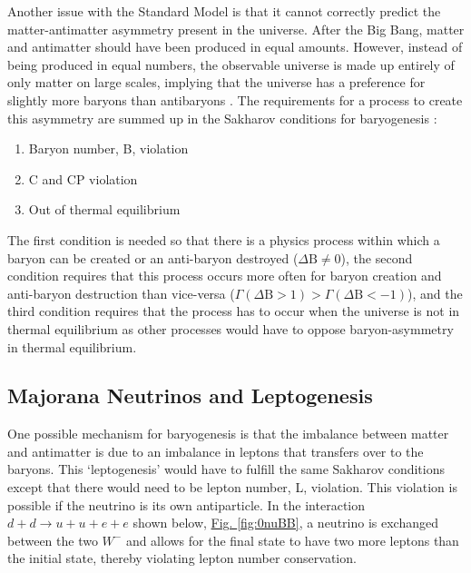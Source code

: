 \documentclass[12pt,a4paper]{article}
\begin{document}
Another issue with the Standard Model is that it cannot correctly predict the matter-antimatter asymmetry present in the universe. After the Big Bang, matter and antimatter should have been produced in equal amounts. However, instead of being produced in equal numbers, the observable universe is made up entirely of only matter on large scales, implying that the universe has a preference for slightly more baryons than antibaryons \cite{Canetti:2012zc}. The requirements for a process to create this asymmetry are summed up in the Sakharov conditions for baryogenesis \cite{Sakharov:1967dj}:
\begin{enumerate}
\item Baryon number, B, violation
\item C and CP violation
\item Out of thermal equilibrium
\end{enumerate}
The first condition is needed so that there is a physics process within which a baryon can be created or an anti-baryon destroyed ($\Delta \textrm{B}\neq0$), the second condition requires that this process occurs more often for baryon creation and anti-baryon destruction than vice-versa ($\Gamma(\Delta \textrm{B}>1) > \Gamma(\Delta \textrm{B}<-1)$), and the third condition requires that the process has to occur when the universe is not in thermal equilibrium as other processes would have to oppose baryon-asymmetry in thermal equilibrium.

\subsection{Majorana Neutrinos and Leptogenesis}
One possible mechanism for baryogenesis is that the imbalance between matter and antimatter is due to an imbalance in leptons that transfers over to the baryons. This `leptogenesis' would have to fulfill the same Sakharov conditions except that there would need to be lepton number, L, violation. This violation is possible if the neutrino is its own antiparticle. In the interaction $d + d \rightarrow u + u + e + e$ shown below,  \hyperref[fig:0nuBB]{Fig. \ref*{fig:0nuBB}}, a neutrino is exchanged between the two $W^-$ and allows for the final state to have two more leptons than the initial state, thereby violating lepton number conservation.
\end{document}
